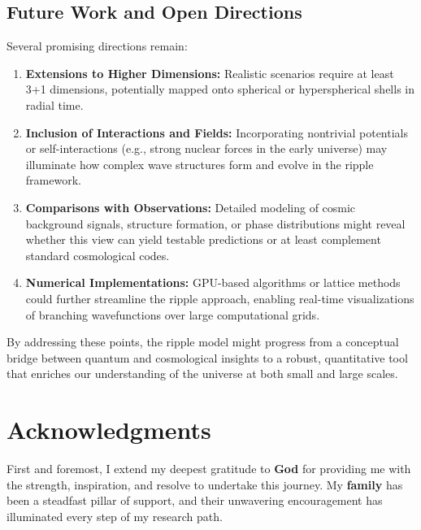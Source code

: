 \documentclass[11pt]{article}
\begin{document}
\subsection{Future Work and Open Directions}
\label{subsec:future-work}
Several promising directions remain:
\begin{enumerate}
  \item \textbf{Extensions to Higher Dimensions:} Realistic scenarios 
        require at least 3+1 dimensions, potentially mapped onto spherical 
        or hyperspherical shells in radial time.
  \item \textbf{Inclusion of Interactions and Fields:} Incorporating 
        nontrivial potentials or self-interactions (e.g., strong nuclear 
        forces in the early universe) may illuminate how complex wave 
        structures form and evolve in the ripple framework.
  \item \textbf{Comparisons with Observations:} Detailed modeling of 
        cosmic background signals, structure formation, or phase 
        distributions might reveal whether this view can yield 
        testable predictions or at least complement standard 
        cosmological codes.
  \item \textbf{Numerical Implementations:} GPU-based algorithms 
        or lattice methods could further streamline the ripple 
        approach, enabling real-time visualizations of branching 
        wavefunctions over large computational grids.
\end{enumerate}
By addressing these points, the ripple model might progress from a 
conceptual bridge between quantum and cosmological insights 
to a robust, quantitative tool that enriches our understanding 
of the universe at both small and large scales.


\section{Acknowledgments}
\label{sec:acknowledgments}

First and foremost, I extend my deepest gratitude to \textbf{God} for 
providing me with the strength, inspiration, and resolve to undertake 
this journey. My \textbf{family} has been a steadfast pillar of support, 
and their unwavering encouragement has illuminated every step of my 
research path.
\end{document}
